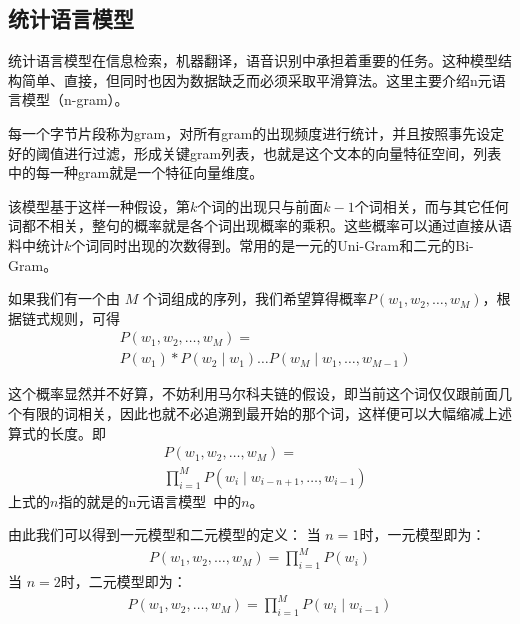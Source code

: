 \documentclass[11pt,a4paper]{article}
\begin{document}
	\subsection{统计语言模型}
	
	统计语言模型在信息检索，机器翻译，语音识别中承担着重要的任务。这种模型结构简单、直接，但同时也因为数据缺乏而必须采取平滑算法。这里主要介绍n元语言模型（n-gram）。
	
	每一个字节片段称为gram，对所有gram的出现频度进行统计，并且按照事先设定好的阈值进行过滤，形成关键gram列表，也就是这个文本的向量特征空间，列表中的每一种gram就是一个特征向量维度。
	
	该模型基于这样一种假设，第$k$个词的出现只与前面$k-1$个词相关，而与其它任何词都不相关，整句的概率就是各个词出现概率的乘积。这些概率可以通过直接从语料中统计$k$个词同时出现的次数得到。常用的是一元的Uni-Gram和二元的Bi-Gram。
	
	如果我们有一个由 $M$ 个词组成的序列，我们希望算得概率$P(w_1,w_2,\dots, w_M)$，根据链式规则，可得
	\begin{equation}
		\begin{aligned}
			&P(w_{1}, w_{2}, \dots, w_{M})=\\
			&P(w_{1}) * P(w_{2} \mid w_{1}) \dots P(w_{M} \mid w_{1}, \dots, w_{M-1})
		\end{aligned}
	\end{equation}
	
	这个概率显然并不好算，不妨利用马尔科夫链的假设，即当前这个词仅仅跟前面几个有限的词相关，因此也就不必追溯到最开始的那个词，这样便可以大幅缩减上述算式的长度。即
	\begin{equation}
		\begin{aligned}
			&P(w_{1}, w_{2}, \dots, w_{M})=\\
			&\prod_{i=1}^{M} P(w_{i} \mid w_{i-n+1}, \dots, w_{i-1})
		\end{aligned}
	\end{equation}
	上式的$n$指的就是的n元语言模型~\citep{cavnar1994n}中的$n$。
	
	由此我们可以得到一元模型和二元模型的定义：
	当 $n=1$时，一元模型即为：
	\begin{equation}
		\begin{aligned}
			P(w_{1}, w_{2}, \dots, w_{M})=\prod_{i=1}^{M} P(w_{i})
		\end{aligned}
	\end{equation}
	当 $n=2$时，二元模型即为：
	\begin{equation}
		\begin{aligned}
			P(w_{1}, w_{2}, \dots, w_{M})=\prod_{i=1}^{M} P(w_{i} \mid w_{i-1})
		\end{aligned}
	\end{equation}
	
\end{document}
